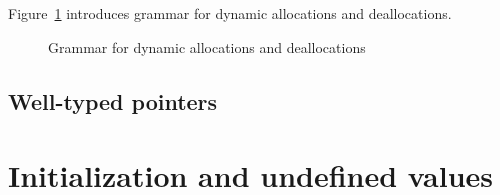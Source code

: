 \subsection{}
\label{sec:alloc-dealloc}
\nodiff


Figure~\ref{fig:gram:allocation} introduces grammar for dynamic allocations and
deallocations.

\begin{figure}[htp]
  \begin{cadre}
      
    \end{cadre}
  \caption{Grammar for dynamic allocations and deallocations}
\label{fig:gram:allocation}
\end{figure}


\subsection{}
\label{sec:dangling}
\nodiff



\subsection{Well-typed pointers}
\label{sec:typedpointers}


\section{Initialization and undefined values}
\label{sec:initialized}
\nodiff


